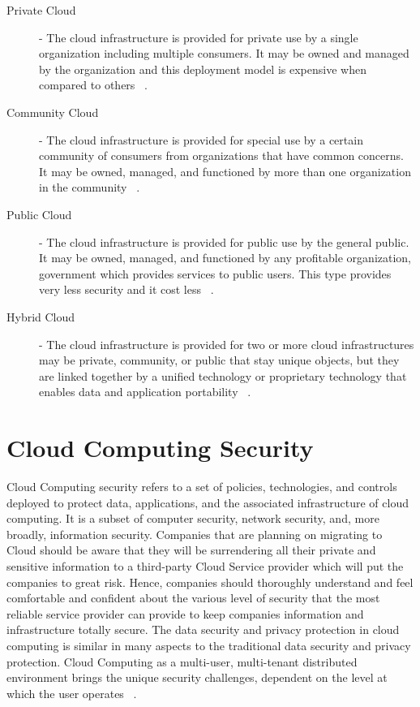 \begin{description}


\item[Private Cloud]  - The cloud infrastructure is provided for private
use by a single organization including multiple consumers. It may be owned
and managed by the organization and this deployment model is expensive 
when compared to others ~\cite{hid-sp18-513-cloud3}.

\item[Community Cloud] - The cloud infrastructure is provided for special use
by a certain community of consumers from organizations that have  common 
concerns. It may be owned, managed, and functioned by more than one 
organization in the community ~\cite{hid-sp18-513-cloud3}.

\item[Public Cloud] - The cloud infrastructure is provided for public use by 
the general public. It may be owned, managed, and functioned by any  profitable 
organization, government which provides services to public users. This type 
provides very less security and it cost less ~\cite{hid-sp18-513-cloud3}.

\item[Hybrid Cloud] -  The cloud infrastructure is provided for two or more cloud 
infrastructures may be private, community, or public that stay unique  objects, 
but they are linked together by a unified technology or proprietary technology
that enables data and application portability ~\cite{hid-sp18-513-cloud3}.

  
\end{description}

\section{Cloud Computing Security}
Cloud Computing security refers to a set of policies, technologies, 
and controls deployed to protect data, applications, and the associated
infrastructure of cloud computing. It is a subset of computer security, 
network security, and, more broadly, information security. Companies that
are planning on migrating to Cloud should be aware that they will be 
surrendering all their private and sensitive information to a third-party
Cloud Service provider which will put the companies to great risk. Hence, 
companies should thoroughly understand and feel comfortable and confident
about the various level of security that the most reliable service provider
can provide to keep companies information and infrastructure 
totally secure.
The data security and privacy protection in cloud computing is similar in 
many aspects to the traditional data security and privacy protection. 
Cloud Computing as a multi-user, multi-tenant distributed environment brings 
the unique security challenges, dependent on the level at which
the user operates ~\cite{hid-sp18-513-zissis2012addressing}.

